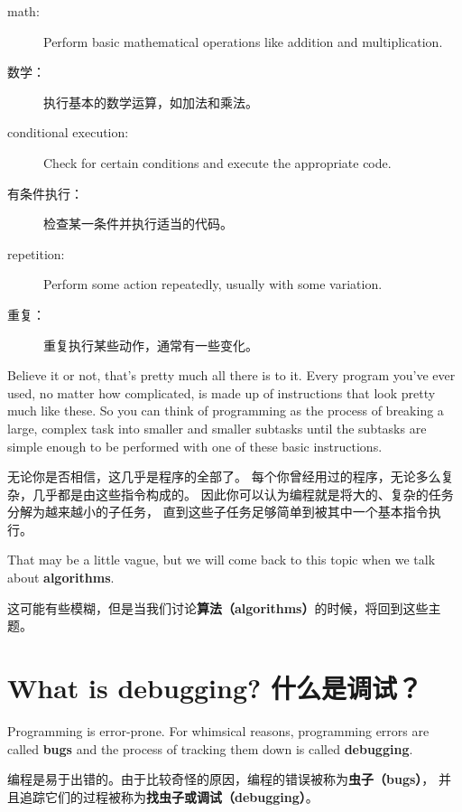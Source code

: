 \documentclass[10pt]{book}
\begin{document}
\begin{CJK}{UTF8}{gbsn}
\begin{description}
\item[math:] Perform basic mathematical operations like addition and
multiplication.

\item[数学：] 执行基本的数学运算，如加法和乘法。

\item[conditional execution:] Check for certain conditions and
execute the appropriate code.

\item[有条件执行：] 检查某一条件并执行适当的代码。

\item[repetition:] Perform some action repeatedly, usually with
some variation.

\item[重复：] 重复执行某些动作，通常有一些变化。

\end{description}

Believe it or not, that's pretty much all there is to it.  Every
program you've ever used, no matter how complicated, is made up of
instructions that look pretty much like these.  So you can think of
programming as the process of breaking a large, complex task
into smaller and smaller subtasks until the subtasks are
simple enough to be performed with one of these basic instructions.

无论你是否相信，这几乎是程序的全部了。
每个你曾经用过的程序，无论多么复杂，几乎都是由这些指令构成的。
因此你可以认为编程就是将大的、复杂的任务分解为越来越小的子任务，
直到这些子任务足够简单到被其中一个基本指令执行。

That may be a little vague, but we will come back to this topic
when we talk about {\bf algorithms}.

这可能有些模糊，但是当我们讨论{\bf 算法（algorithms）}的时候，将回到这些主题。

\section{What is debugging? 什么是调试？}

Programming is error-prone.  For whimsical reasons, programming errors
are called {\bf bugs} and the process of tracking them down is called
{\bf debugging}.

编程是易于出错的。由于比较奇怪的原因，编程的错误被称为{\bf 虫子（bugs）}，
并且追踪它们的过程被称为{\bf 找虫子或调试（debugging）}。


\end{CJK}
\end{document}
